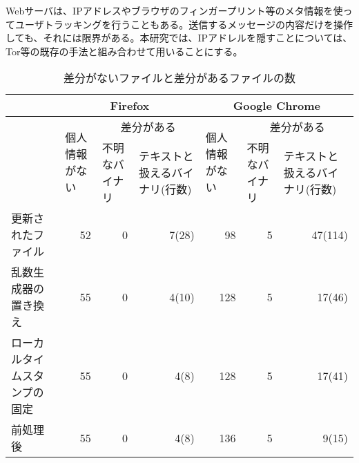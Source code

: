 \documentclass[submit,techrep]{ipsj}
\begin{document}
Webサーバは、IPアドレスやブラウザのフィンガープリント等のメタ情報を使ってユーザトラッキングを行うこともある。送信するメッセージの内容だけを操作しても、それには限界がある。本研究では、IPアドレルを隠すことについては、Tor等の既存の手法と組み合わせて用いることにする。










 
 
\begin{table*}[ht]
\caption{差分がないファイルと差分があるファイルの数}
\centering
\begin{tabular}{|p{2cm}|l|p{1.9cm}|p{1.9cm}|l|p{1.9cm}|p{1.9cm}|}
\hline
&\multicolumn{3}{|c|}{\footnotesize{Firefox}}&\multicolumn{3}{c|}{\footnotesize{Google Chrome}}\\
\hline
&\multirow{2}{1.5cm}{\footnotesize{個人情報がない}} &
\multicolumn{2}{c|}{\footnotesize{差分がある}} &\multirow{2}{1.5cm}{\footnotesize{個人情報がない}}&
\multicolumn{2}{c|}{\footnotesize{差分がある}} \\
\cline{3-4}\cline{6-7}
  & & \footnotesize{不明なバイナリ} & \footnotesize{テキストと扱えるバイナリ(行数)}& &\footnotesize{不明なバイナリ} & \footnotesize{テキストと扱えるバイナリ(行数)} \\
\hline
\footnotesize{更新されたファイル}&\multicolumn{1}{r|}{\footnotesize{52}}&\multicolumn{1}{r|}{\footnotesize{0}}&\multicolumn{1}{r|}{\footnotesize{7(28)}}  & \multicolumn{1}{r|}{\footnotesize{98}} & \multicolumn{1}{r|}{\footnotesize{5}} & \multicolumn{1}{r|}{\footnotesize{47(114)}} \\
\hline
\footnotesize{乱数生成器の置き換え}&\multicolumn{1}{r|}{\footnotesize{55}}&\multicolumn{1}{r|}{\footnotesize{0}}&\multicolumn{1}{r|}{\footnotesize{4(10)} }& \multicolumn{1}{r|}{\footnotesize{128} }& \multicolumn{1}{r|}{\footnotesize{5} }& \multicolumn{1}{r|}{\footnotesize{17(46)}} \\
\hline
\footnotesize{ローカルタイムスタンプの固定}&\multicolumn{1}{r|}{\footnotesize{55}}&\multicolumn{1}{r|}{\footnotesize{0}}&\multicolumn{1}{r|}{\footnotesize{4(8)} }&  \multicolumn{1}{r|}{\footnotesize{128} }& \multicolumn{1}{r|}{\footnotesize{5} }&\multicolumn{1}{r|}{\footnotesize{17(41) }}\\
\hline
\footnotesize{前処理後}&\multicolumn{1}{r|}{\footnotesize{55}}&\multicolumn{1}{r|}{\footnotesize{0}}&\multicolumn{1}{r|}{\footnotesize{4(8)}} &\multicolumn{1}{r|}{ \footnotesize{136} }& \multicolumn{1}{r|}{\footnotesize{5} }&\multicolumn{1}{r|}{\footnotesize{9(15)}}\\
\hline
\end{tabular}
\label{fig:result}
\end{table*}
\end{document}
